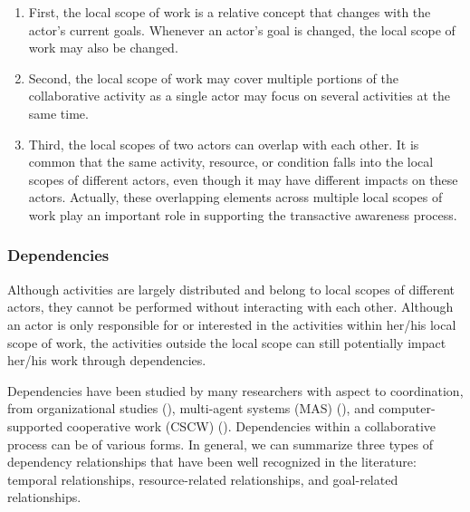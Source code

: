 \begin{enumerate}
	\item First, the local scope of work is a relative concept that changes with the actor’s current goals. Whenever an actor’s goal is changed, the local scope of work may also be changed.
	\item Second, the local scope of work may cover multiple portions of the collaborative activity as a single actor may focus on several activities at the same time. 
	\item Third, the local scopes of two actors can overlap with each other. It is common that the same activity, resource, or condition falls into the local scopes of different actors, even though it may have different impacts on these actors. Actually, these overlapping elements across multiple local scopes of work play an important role in supporting the transactive awareness process.
\end{enumerate}

\subsubsection{Dependencies} %
\label{ssub:dependencies}
Although activities are largely distributed and belong to local scopes of different actors, they cannot be performed without interacting with each other. Although an actor is only responsible for or interested in the activities within her/his local scope of work, the activities outside the local scope can still potentially impact her/his work through dependencies. 

Dependencies have been studied by many researchers with aspect to coordination, from organizational studies (\cite{yu1993actor,crowston1994taxonomy}), multi-agent systems (MAS) (\cite{sichman1998social,sikora1998a,sichman2002multi}), and computer-supported cooperative work (CSCW) (\cite{raposo2002coordination,cataldo2006a,de2007supporting}). Dependencies within a collaborative process can be of various forms. In general, we can summarize three types of dependency relationships that have been well recognized in the literature: temporal relationships, resource-related relationships, and goal-related relationships.


